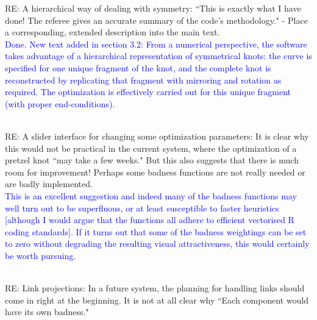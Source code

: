 \documentclass[12pt]{article}
\begin{document}
RE: A hierarchical way of dealing with symmetry: ``This is exactly
what I have done!  The referee gives an accurate summary of the code's
methodology." - Place a corresponding, extended description into the
main text.\textcolor{blue}{\\Done.  New text added in section 3.2:
  From a numerical perspective, the software takes advantage of a
  hierarchical representation of symmetrical knots: the curve is
  specified for one unique fragment of the knot, and the complete knot
  is reconstructed by replicating that fragment with mirroring and
  rotation as required.  The optimization is effectively carried out
  for this unique fragment (with proper end-conditions).\\ \\}




RE: A slider interface for changing some optimization parameters: It
is clear why this would not be practical in the current system, where
the optimization of a pretzel knot ``may take a few weeks."  But this
also suggests that there is much room for improvement!  Perhaps some
badness functions are not really needed or are badly implemented.
\textcolor{blue}{\\ This is an excellent suggestion and indeed many of
  the badness functions may well turn out to be superfluous, or at
  least susceptible to faster heuristics [although I would argue that
    the functions all adhere to efficient vectorised R coding
    standards].  If it turns out that some of the badness weightings
  can be set to zero without degrading the resulting visual
  attractiveness, this would certainly be worth pursuing.\\ \\}

RE: Link projections: In a future system, the planning for handling
links should come in right at the beginning.  It is not at all clear
why ``Each component would have its own badness."
\end{document}
